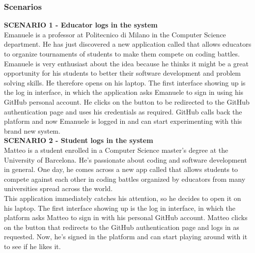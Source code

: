 \subsubsection{Scenarios}
\textbf{SCENARIO 1 - Educator logs in the system} \\
    Emanuele is a professor at Politecnico di Milano in the Computer Science department. He has just discovered a new application called \app that allows educators to organize tournaments of students to make them compete on coding battles.\\
    Emanuele is very enthusiast about the idea because he thinks it might be a great opportunity for his students to better their software development and problem solving skills. He therefore opens \app on his laptop. The first interface showing up is the log in interface, in which the application asks Emanuele to sign in using his GitHub personal account. He clicks on the button to be redirected to the GitHub authentication page and uses his credentials as required. GitHub calls back the \app platform and now Emanuele is logged in and can start experimenting with this brand new system.\\
    
    \textbf{SCENARIO 2 - Student logs in the system} \\
    Matteo is a student enrolled in a Computer Science master's degree at the University of Barcelona. He's passionate about coding and software development in general. One day, he comes across a new app called \app that allows students to compete against each other in coding battles organized by educators from many universities spread across the world.  \\
    This application immediately catches his attention, so he decides to open it on his laptop. The first interface showing up is the log in interface, in which the \app platform asks Matteo to sign in with his personal GitHub account. Matteo clicks on the button that redirects to the GitHub authentication page and logs in as requested.
    Now, he's signed in the platform and can start playing around with it to see if he likes it.\\
    
